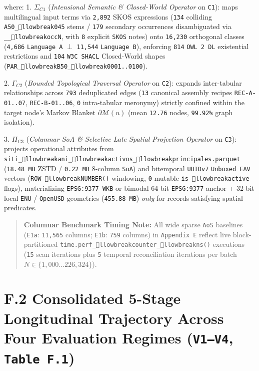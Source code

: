 \documentclass[10pt,a4paper]{article}
\begin{document}
where:
1. $\Sigma_{C1}$ (\textit{Intensional Semantic \& Closed-World Operator} on \texttt{C1}): maps multilingual input terms via \texttt{2,892} SKOS expressions (\texttt{134} colliding \texttt{A50\_llowbreak{}045} stems / \texttt{179} secondary occurrences disambiguated via \texttt{\_\_llowbreak{}occN}, with \texttt{8} explicit \texttt{SKOS} notes) onto \texttt{16,230} orthogonal classes (\texttt{4,686} \texttt{Language A} $\perp$ \texttt{11,544} \texttt{Language B}), enforcing \texttt{814} \texttt{OWL 2 DL} existential restrictions and \texttt{104} \texttt{W3C SHACL} Closed-World shapes (\texttt{PAR\_llowbreak{}B50\_llowbreak{}0001..0100}).\par
2. $\Gamma_{C2}$ (\textit{Bounded Topological Traversal Operator} on \texttt{C2}): expands inter-tabular relationships across \texttt{793} deduplicated edges (\texttt{13} canonical assembly recipes \texttt{REC-A-01..07}, \texttt{REC-B-01..06}, \texttt{0} intra-tabular meronymy) strictly confined within the target node's Markov Blanket $\partial\mathcal{M}(u)$ (mean \texttt{12.76} nodes, \texttt{99.92\%} graph isolation).\par
3. $\Pi_{C3}$ (\textit{Columnar SoA \& Selective Late Spatial Projection Operator} on \texttt{C3}): projects operational attributes from \texttt{siti\_llowbreak{}ani\_llowbreak{}activos\_llowbreak{}principales.parquet} (\texttt{18.48 MB} ZSTD / \texttt{0.22 MB} 8-column \texttt{SoA}) and bitemporal \texttt{UUIDv7} \texttt{Unboxed EAV} vectors (\texttt{ROW\_llowbreak{}NUMBER()} windowing, \texttt{0} mutable \texttt{is\_llowbreak{}active} flags), materializing \texttt{EPSG:9377 WKB} or bimodal 64-bit \texttt{EPSG:9377} anchor + 32-bit local \texttt{ENU} / \texttt{OpenUSD} geometries (\texttt{455.88 MB}) \textit{only} for records satisfying spatial predicates.\par

\begin{quote}\small \textbf{Columnar Benchmark Timing Note:} All wide sparse \texttt{AoS} baselines (\texttt{E1a}: \texttt{11,565} columns; \texttt{E1b}: \texttt{759} columns) in \texttt{Appendix E} reflect live block-partitioned \texttt{time.perf\_llowbreak{}counter\_llowbreak{}ns()} executions (\texttt{15} scan iterations plus \texttt{5} temporal reconciliation iterations per batch $N \in \{1,000 \dots 226,324\}$).\end{quote}



\section*{F.2 Consolidated 5-Stage Longitudinal Trajectory Across Four Evaluation Regimes (\texttt{V1--V4}, \texttt{Table F.1})}
\end{document}
